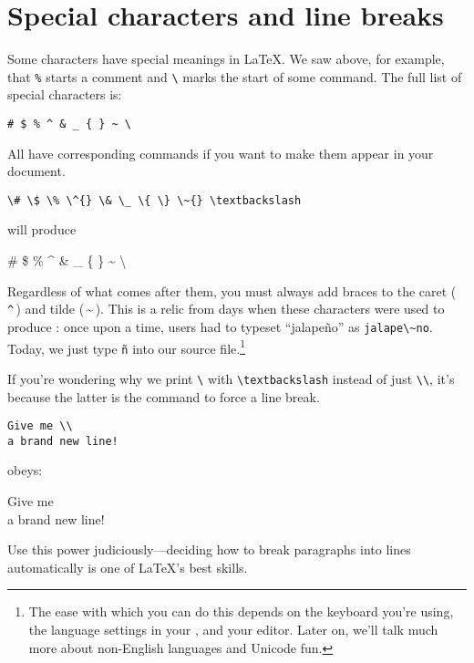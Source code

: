 \section{Special characters and line breaks}

Some characters have special meanings in \LaTeX.
We saw above, for example, that \verb|%| starts a comment
and \verb|\| marks the start of some command.
The full list of special characters is:
\begin{leftfigure}
\begin{lstlisting}
# $ % ^ & _ { } ~ \
\end{lstlisting}
\end{leftfigure}
All have corresponding commands
if you want to make them appear in your document.
\begin{leftfigure}
\begin{lstlisting}
\# \$ \% \^{} \& \_ \{ \} \~{} \textbackslash
\end{lstlisting}
\end{leftfigure}
will produce
\begin{leftfigure}
\lm \# \$ \% \^{} \& \_ \{ \} \~{} \textbackslash
\end{leftfigure}
Regardless of what comes after them, you must always add braces to
the caret (\,\texttt{\^{}}\,) and tilde (\,\~{}\,).
This is a relic from days when these characters were used to produce
:
once upon a time, users had to typeset ``jalapeño'' as
\verb|jalape\~no|.
Today, we just type \texttt{ñ} into our source
file.\punckern\footnote{The ease with which you can do this depends
on the keyboard you're using, the language settings in your ,
and your editor.
Later on, we'll talk much more about non-English languages and Unicode fun.}

If you're wondering why we print \texttt{\textbackslash} with
\verb|\textbackslash| instead of just \verb|\\|,
it's because the latter is the command to force a line break.
\begin{leftfigure}
\begin{lstlisting}
Give me \\
a brand new line!
\end{lstlisting}
\end{leftfigure}
obeys:
\begin{leftfigure}
\lm Give me \\
a brand new line!
\end{leftfigure}
Use this power judiciously---deciding how to break paragraphs into lines
automatically is one of \LaTeX{}'s best skills.

